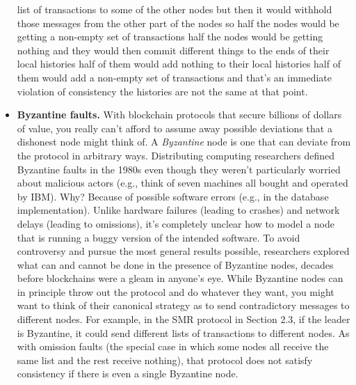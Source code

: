 \begin{itemize}
list of transactions to some of the other nodes but then it would withhold those messages from the other part of
the nodes so half the nodes would be getting a non-empty set of transactions half the nodes would be getting nothing
and they would then commit different things to the ends of their local histories half of them would add nothing
to their local histories half of them would add a non-empty set of transactions and that's an immediate violation of consistency the histories
are not the same at that point.
    \item \textbf{Byzantine faults.} With blockchain protocols that secure billions of dollars of value, you
really can’t afford to assume away possible deviations that a dishonest node might think of.
A \textit{Byzantine} node is one that can deviate from the protocol in arbitrary ways. Distributing
computing researchers defined Byzantine faults in the 1980s even though they weren’t particularly worried about malicious actors (e.g., think of seven machines all bought and operated
by IBM). Why? Because of possible software errors (e.g., in the database implementation).
Unlike hardware failures (leading to crashes) and network delays (leading to omissions), it’s
completely unclear how to model a node that is running a buggy version of the intended
software. To avoid controversy and pursue the most general results possible, researchers
explored what can and cannot be done in the presence of Byzantine nodes, decades before
blockchains were a gleam in anyone’s eye.
While Byzantine nodes can in principle throw out the protocol and do whatever they
want, you might want to think of their canonical strategy as to send contradictory messages
to different nodes. For example, in the SMR protocol in Section 2.3, if the leader is Byzantine,
it could send different lists of transactions to different nodes. As with omission faults (the
special case in which some nodes all receive the same list and the rest receive nothing), that
protocol does not satisfy consistency if there is even a single Byzantine node.\\
\end{itemize}



